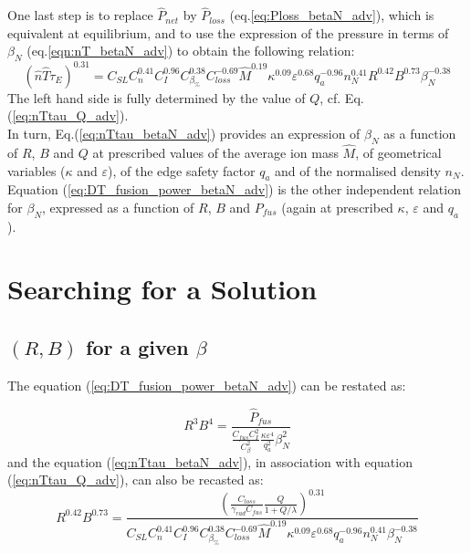 One last step is to replace $\hat P_{net}$ by $\hat P_{loss}$ (eq.\ref{eq:Ploss_betaN_adv}), which is equivalent at equilibrium, and to use the expression of the pressure in terms of $\beta_N$ (eq.\ref{eqn:nT_betaN_adv}) to obtain the following relation:
\begin{equation}
\boxed{
	(\hat n\hat T\tau_E)^{0.31} 
	= 
	C_{SL} C_n^{0.41} C_I^{0.96} C_{\beta_\%}^{0.38} 
	C_{loss}^{-0.69}
	\hat M^{0.19} \kappa^{0.09} \varepsilon^{0.68} q_a^{-0.96}
	n_N^{0.41} R^{0.42} B^{0.73} \beta_N^{-0.38}
}
\label{eq:nTtau_betaN_adv}
\end{equation}
The left hand side is fully determined by the value of $Q$, cf. Eq.(\ref{eq:nTtau_Q_adv}). \\

In turn, Eq.(\ref{eq:nTtau_betaN_adv}) provides an expression of $\beta_N$ as a function of $R$, $B$ and $Q$ at prescribed values of the average ion mass $\hat M$, of geometrical variables ($\kappa$ and $\varepsilon$), of the edge safety factor $q_a$ and of the normalised density $n_N$.
Equation (\ref{eq:DT_fusion_power_betaN_adv}) is the other independent relation for $\beta_N$, expressed as a function of $R$, $B$ and $P_{fus}$ (again at prescribed $\kappa$, $\varepsilon$ and $q_a$).




\chapter{Searching for a Solution}\margintoc
\section{$(R,B)$ for a given $\beta$}
The equation (\ref{eq:DT_fusion_power_betaN_adv}) can be restated as:

\begin{equation}
	R^3 B^4 
	=
	\frac{
		\hat P_{fus}
	}{
		\frac{C_{fus}C_I^2}{C_\beta^2} \frac{\kappa \varepsilon^4}{q_a^2} 
		\beta_N^2 
	}
\end{equation}
and the equation (\ref{eq:nTtau_betaN_adv}), in association with equation (\ref{eq:nTtau_Q_adv}), can also be recasted as:
\begin{equation}
R^{0.42} B^{0.73}
=
\frac{
	\left( 
		\frac{C_{loss}}{\gamma_{rad} C_{fus}} \frac{Q}{1+Q/\lambda} 
	\right)^{0.31} 
}{
	C_{SL} C_n^{0.41} C_I^{0.96} C_{\beta_\%}^{0.38} 
C_{loss}^{-0.69}
\hat M^{0.19} \kappa^{0.09} \varepsilon^{0.68} q_a^{-0.96}
n_N^{0.41}  \beta_N^{-0.38}
}
\end{equation}

